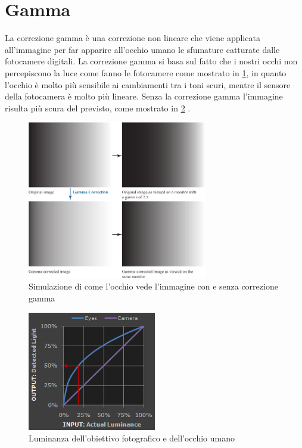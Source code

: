 \section{Gamma}\label{gamma}

La correzione gamma è una correzione non lineare che viene applicata all'immagine per far apparire all'occhio umano le sfumature catturate dalle fotocamere digitali. La correzione gamma si basa sul fatto che i nostri occhi non percepiscono la luce come fanno le fotocamere come mostrato in \cref{fig:gamma-correction}, in quanto l'occhio è molto più sensibile ai cambiamenti tra i toni scuri, mentre il sensore della fotocamera è molto più lineare. Senza la correzione gamma l'immagine risulta più scura del previsto, come mostrato in \cref{fig:gamma} \cite{gamma} \cite{gonzalez_dip}. 

\begin{figure}[ht]
    \centering
    \includegraphics[width=0.7\textwidth]{preprocessing/gamma-correction.pdf}
    \caption{Simulazione di come l'occhio vede l'immagine con e senza correzione gamma}
    \label{fig:gamma-correction}
\end{figure}


\begin{figure}[ht]
    \centering
    \includegraphics[width=0.5\textwidth]{preprocessing/gamma.png}
    \caption{Luminanza dell'obiettivo fotografico e dell'occhio umano}
    \label{fig:gamma}
\end{figure}

